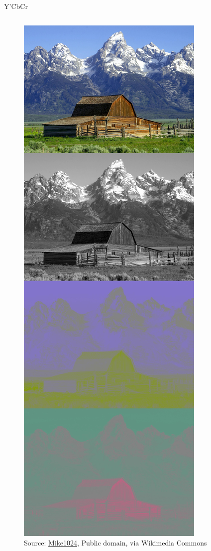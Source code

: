 \documentclass[aspectratio=169,handout,usepdftitle=false]{fireshonks}
\begin{document}
\begin{frame}{Y'CbCr}
\begin{columns}
\begin{column}
\begin{figure}
                \includegraphics[height=10\baselineskip,keepaspectratio]{figures/Barns_grand_tetons_YCbCr_separation.jpg}
                \caption*{Source: \href{https://commons.wikimedia.org/wiki/File:Barns_grand_tetons_YCbCr_separation.jpg}{Mike1024}, Public domain, via Wikimedia Commons}
            \end{figure}
        \end{column}
    \end{columns}
\end{frame}
\end{document}
